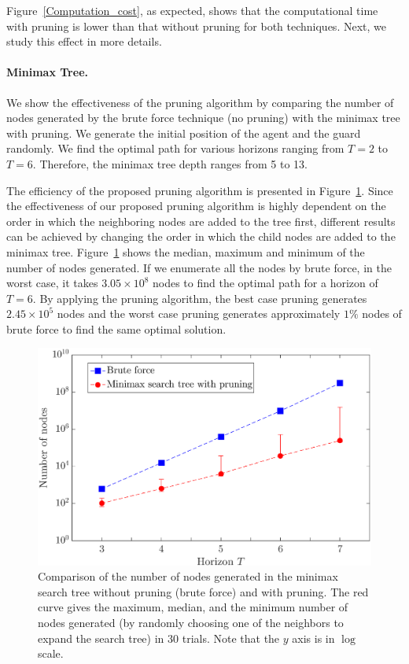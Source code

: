 \documentclass[10 pt, conference]{ieeeconf}
\begin{document}

Figure~\ref{Computation_cost}, as expected, shows that the computational time with pruning is lower than that without pruning for both techniques. Next, we study this effect in more details.

\paragraph{Minimax Tree.} We show the effectiveness of the pruning algorithm by comparing the number of nodes generated by the brute force technique (no pruning) with the minimax tree with pruning.   We generate the initial position of the agent and the guard randomly. We find the optimal path for various horizons ranging from $T = 2$ to $T = 6$. Therefore, the minimax tree depth ranges from 5 to 13. 

The efficiency of the proposed pruning algorithm is presented in Figure~\ref{prune_compare}. Since the effectiveness of our proposed pruning algorithm is  highly dependent on the order in which the neighboring nodes are added to the tree first,  different results can be achieved by changing the order in which the child nodes are added to the minimax tree.  Figure~\ref{prune_compare} shows the median, maximum and minimum of the number of  nodes generated.  If we enumerate all the nodes by brute force, in the worst case, it takes $3.05\times10^8$ nodes to find the optimal path for a horizon of $T=6$. By applying the pruning algorithm, the best case pruning generates $2.45\times 10^5$ nodes and the worst case pruning generates approximately  $1\%$ nodes of brute force to find the same optimal solution. 

\begin{figure}
\centering
\includegraphics[width=0.7\columnwidth]{figs/Prune_Compare.eps}
\caption{Comparison of the number of nodes generated in the minimax search tree without pruning (brute force) and with pruning. The red curve gives the maximum, median, and the minimum number of nodes generated (by randomly choosing one of the neighbors to expand the search tree) in 30  trials.  Note that the $y$ axis is in $\log$ scale.
}
\label{prune_compare}      
\end{figure}
\end{document}

